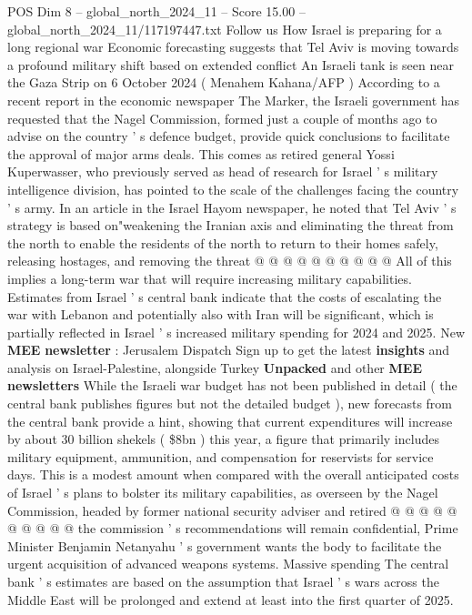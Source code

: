 \begin{textsample}{POS Dim 8 – global\_north\_2024\_11 – Score 15.00 – global\_north\_2024\_11/117197447.txt}  \label{ex:f8_pos_051}
Follow us How Israel is preparing for a long regional war Economic forecasting suggests that Tel Aviv is moving towards a profound military shift based on extended conflict An Israeli tank is seen near the Gaza Strip on 6 October 2024 ( Menahem Kahana/AFP ) According to a recent report in the economic newspaper The Marker, the Israeli government has requested that the Nagel Commission, formed just a couple of months ago to advise on the country ' s defence budget, provide quick conclusions to facilitate the approval of major arms deals.
This comes as retired general Yossi Kuperwasser, who previously served as head of research for Israel ' s military intelligence division, has pointed to the scale of the challenges facing the country ' s army.
In an article in the Israel Hayom newspaper, he noted that Tel Aviv ' s strategy is based on"weakening the Iranian axis and eliminating the threat from the north to enable the residents of the north to return to their homes safely, releasing hostages, and removing the threat @ @ @ @ @ @ @ @ @ @ All of this implies a long-term war that will require increasing military capabilities.
Estimates from Israel ' s central bank indicate that the costs of escalating the war with Lebanon and potentially also with Iran will be significant, which is partially reflected in Israel ' s increased military spending for 2024 and 2025.
New \textbf{MEE} \textbf{newsletter} : Jerusalem Dispatch Sign up to get the latest \textbf{insights} and analysis on Israel-Palestine, alongside Turkey \textbf{Unpacked} and other \textbf{MEE} \textbf{newsletters} While the Israeli war budget has not been published in detail ( the central bank publishes figures but not the detailed budget ), new forecasts from the central bank provide a hint, showing that current expenditures will increase by about 30 billion shekels ( \$8bn ) this year, a figure that primarily includes military equipment, ammunition, and compensation for reservists for service days.
This is a modest amount when compared with the overall anticipated costs of Israel ' s plans to bolster its military capabilities, as overseen by the Nagel Commission, headed by former national security adviser and retired @ @ @ @ @ @ @ @ @ @ the commission ' s recommendations will remain confidential, Prime Minister Benjamin Netanyahu ' s government wants the body to facilitate the urgent acquisition of advanced weapons systems.
Massive spending The central bank ' s estimates are based on the assumption that Israel ' s wars across the Middle East will be prolonged and extend at least into the first quarter of 2025.

\end{textsample}
